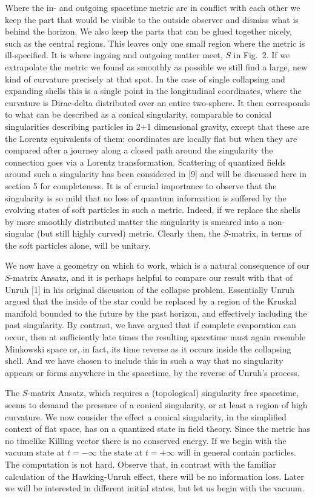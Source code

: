 Where the in- and outgoing spacetime metric are in conflict with each
other we keep the part that would be visible to the outside observer
and dismiss what is behind the horizon. We also keep the parts that can
be glued together nicely, such as the central regions. This leaves only
one small region where the metric is ill-specified. It is where ingoing
and outgoing matter meet, $S$ in Fig.~2. If we extrapolate the
metric we found as smoothly as possible we still find a large, new kind
of curvature precisely at that spot. In the case of single collapsing
and expanding shells this is a single point in the longitudinal
coordinates, where the curvature is Dirac-delta distributed over an
entire two-sphere. It then
corresponds to what can be described as a conical singularity, comparable
to conical singularities describing particles in 2+1 dimensional
gravity, except that these are the Lorentz equivalents of them:
coordinates are locally flat but when they are compared after a journey
along a closed path around the singularity the connection goes via a
Lorentz transformation.  Scattering of quantized fields around such a
singularity has been considered in [9] and will be discussed here in
section 5 for completeness. It is of crucial importance to observe that
the singularity is so mild that no loss of quantum information is
suffered by the evolving states of soft particles in such a metric.
Indeed, if we replace the shells by more smoothly distributed matter
the singularity is smeared into a non-singular (but still highly
curved) metric. Clearly then, the $S$-matrix, in terms of the soft
particles alone, will be unitary.

We now have a geometry on which to work, which is a natural consequence
of our $S$-matrix Ansatz, and it is perhaps helpful to compare our
result with that of Unruh [1] in his original discussion of the
collapse problem. Essentially Unruh argued that the inside of the star
could be replaced by a region of the Kruskal manifold bounded to the
future by the past horizon, and effectively including the past
singularity. By contrast, we have argued that if complete evaporation
can occur, then at sufficiently late times the resulting spacetime must
again resemble Minkowski space or, in fact, its time reverse as it
occurs inside the collapsing shell. And we have chosen to include this
in such a way that no singularity appears or forms anywhere in the
spacetime, by the reverse of Unruh's process.

\bigskip
{}
\medskip
The $S$-matrix Ansatz, which requires a (topological) singularity free
spacetime, seems to demand the presence of a conical singularity, or at
least a region of high curvature. We now consider the effect a conical
singularity, in the simplified context of flat space, has on a
quantized state in field theory. Since the metric has no timelike
Killing vector there is no conserved energy. If we begin with the
vacuum state at $t=-\infty$ the state at $t=+\infty$ will in general
contain particles. The computation is not hard. Observe that, in
contrast with the familiar calculation of the Hawking-Unruh effect,
there will be no information loss. Later we will be interested in
different initial states, but let us begin with the vacuum.

